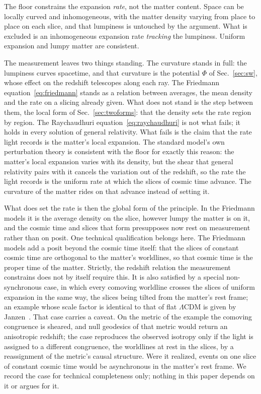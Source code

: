 \documentclass[aps,prd,reprint,amsmath,amssymb,superscriptaddress]{revtex4-2}
\begin{document}
The floor constrains the expansion \emph{rate}, not the matter content. Space can be locally curved and inhomogeneous, with the matter density varying from place to place on each slice, and that lumpiness is untouched by the argument. What is excluded is an inhomogeneous expansion rate \emph{tracking} the lumpiness. Uniform expansion and lumpy matter are consistent.

The measurement leaves two things standing. The curvature stands in full: the lumpiness curves spacetime, and that curvature is the potential $\Phi$ of Sec.~\ref{sec:sw}, whose effect on the redshift telescopes along each ray. The Friedmann equation~\eqref{eq:friedmann} stands as a relation between averages, the mean density and the rate on a slicing already given. What does not stand is the step between them, the local form of Sec.~\ref{sec:twoforms}: that the density sets the rate region by region. The Raychaudhuri equation~\eqref{eq:raychaudhuri} is not what fails; it holds in every solution of general relativity. What fails is the claim that the rate light records is the matter's local expansion. The standard model's own perturbation theory is consistent with the floor for exactly this reason: the matter's local expansion varies with its density, but the shear that general relativity pairs with it cancels the variation out of the redshift, so the rate the light records is the uniform rate at which the slices of cosmic time advance. The curvature of the matter rides on that advance instead of setting it.

What does set the rate is then the global form of the principle. In the Friedmann models it is the average density on the slice, however lumpy the matter is on it, and the cosmic time and slices that form presupposes now rest on measurement rather than on posit. One technical qualification belongs here. The Friedmann models add a posit beyond the cosmic time itself: that the slices of constant cosmic time are orthogonal to the matter's worldlines, so that cosmic time is the proper time of the matter. Strictly, the redshift relation the measurement constrains does not by itself require this. It is also satisfied by a special non-synchronous case, in which every comoving worldline crosses the slices of uniform expansion in the same way, the slices being tilted from the matter's rest frame; an example whose scale factor is identical to that of flat $\Lambda$CDM is given by Janzen~\cite{Janzen2015}. That case carries a caveat. On the metric of the example the comoving congruence is sheared, and null geodesics of that metric would return an anisotropic redshift; the case reproduces the observed isotropy only if the light is assigned to a different congruence, the worldlines at rest in the slices, by a reassignment of the metric's causal structure. Were it realized, events on one slice of constant cosmic time would be asynchronous in the matter's rest frame. We record the case for technical completeness only; nothing in this paper depends on it or argues for it.
\end{document}
